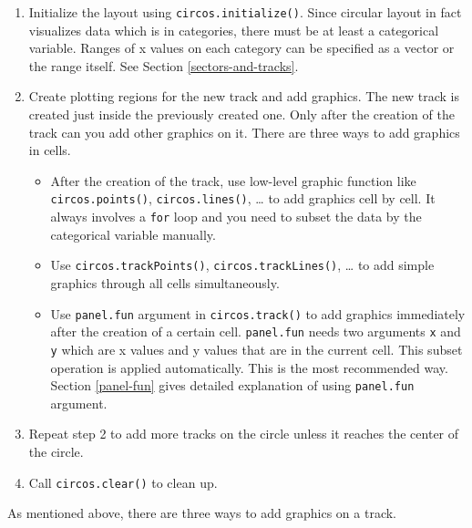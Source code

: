\documentclass[]{book}
\providecommand{\tightlist}{%
  \setlength{\itemsep}{0pt}\setlength{\parskip}{0pt}}
\begin{document}
\begin{enumerate}
\def\labelenumi{\arabic{enumi}.}
\item
  Initialize the layout using \texttt{circos.initialize()}. Since
  circular layout in fact visualizes data which is in categories, there
  must be at least a categorical variable. Ranges of x values on each
  category can be specified as a vector or the range itself. See Section
  \ref{sectors-and-tracks}.
\item
  Create plotting regions for the new track and add graphics. The new
  track is created just inside the previously created one. Only after
  the creation of the track can you add other graphics on it. There are
  three ways to add graphics in cells.

  \begin{itemize}
  \tightlist
  \item
    After the creation of the track, use low-level graphic function like
    \texttt{circos.points()}, \texttt{circos.lines()}, \ldots{} to add
    graphics cell by cell. It always involves a \texttt{for} loop and
    you need to subset the data by the categorical variable manually.
  \item
    Use \texttt{circos.trackPoints()}, \texttt{circos.trackLines()},
    \ldots{} to add simple graphics through all cells simultaneously.
  \item
    Use \texttt{panel.fun} argument in \texttt{circos.track()} to add
    graphics immediately after the creation of a certain cell.
    \texttt{panel.fun} needs two arguments \texttt{x} and \texttt{y}
    which are x values and y values that are in the current cell. This
    subset operation is applied automatically. This is the most
    recommended way. Section \ref{panel-fun} gives detailed explanation
    of using \texttt{panel.fun} argument.
  \end{itemize}
\item
  Repeat step 2 to add more tracks on the circle unless it reaches the
  center of the circle.
\item
  Call \texttt{circos.clear()} to clean up.
\end{enumerate}

As mentioned above, there are three ways to add graphics on a track.
\end{document}
